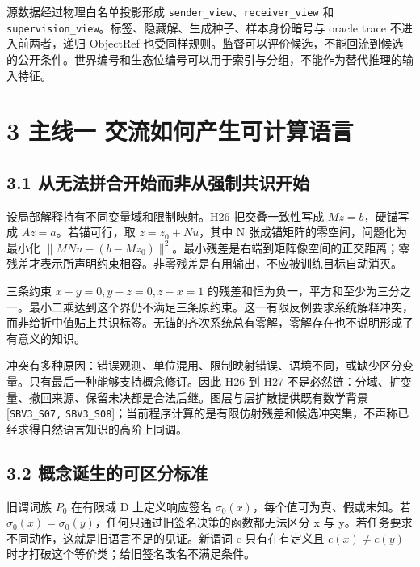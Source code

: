 \documentclass[
  10pt,
]{article}
\begin{document}
源数据经过物理白名单投影形成
\nolinkurl{sender_view}、\nolinkurl{receiver_view} 和
\nolinkurl{supervision_view}。标签、隐藏解、生成种子、样本身份暗号与
oracle trace 不进入前两者，递归 ObjectRef
也受同样规则。监督可以评价候选，不能回流到候选的公开条件。世界编号和生态位编号可以用于索引与分组，不能作为替代推理的输入特征。

\section{3 主线一
交流如何产生可计算语言}\label{ux4e3bux7ebfux4e00-ux4ea4ux6d41ux5982ux4f55ux4ea7ux751fux53efux8ba1ux7b97ux8bedux8a00}

\subsection{3.1
从无法拼合开始而非从强制共识开始}\label{ux4eceux65e0ux6cd5ux62fcux5408ux5f00ux59cbux800cux975eux4eceux5f3aux5236ux5171ux8bc6ux5f00ux59cb}

设局部解释持有不同变量域和限制映射。H26 把交叠一致性写成
\(Mz=b\)，硬锚写成 \(Az=a\)。若锚可行，取 \(z=z_0+Nu\)，其中 N
张成锚矩阵的零空间，问题化为最小化
\(\|MNu-(b-Mz_0)\|^2\)。最小残差是右端到矩阵像空间的正交距离；零残差才表示所声明约束相容。非零残差是有用输出，不应被训练目标自动消灭。

三条约束 \(x-y=0,y-z=0,z-x=1\)
的残差和恒为负一，平方和至少为三分之一。最小二乘达到这个界仍不满足三条原约束。这一有限反例要求系统解释冲突，而非给折中值贴上共识标签。无锚的齐次系统总有零解，零解存在也不说明形成了有意义的知识。

冲突有多种原因：错误观测、单位混用、限制映射错误、语境不同，或缺少区分变量。只有最后一种能够支持概念修订。因此
H26 到 H27
不是必然链：分域、扩变量、撤回来源、保留未决都是合法后继。图层与层扩散提供既有数学背景
{[}\nolinkurl{SBV3_S07,}
\nolinkurl{SBV3_S08}{]}；当前程序计算的是有限仿射残差和候选冲突集，不声称已经求得自然语言知识的高阶上同调。

\subsection{3.2
概念诞生的可区分标准}\label{ux6982ux5ff5ux8bdeux751fux7684ux53efux533aux5206ux6807ux51c6}

旧谓词族 \(P_0\) 在有限域 D 上定义响应签名
\(\sigma_0(x)\)，每个值可为真、假或未知。若
\(\sigma_0(x)=\sigma_0(y)\)，任何只通过旧签名决策的函数都无法区分 x 与
y。若任务要求不同动作，这就是旧语言不足的见证。新谓词 c 只有在有定义且
\(c(x)\ne c(y)\) 时才打破这个等价类；给旧签名改名不满足条件。
\end{document}
